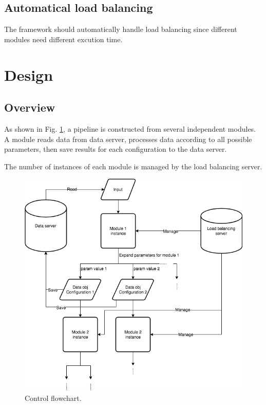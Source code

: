 \documentclass{article}
\begin{document}
    \subsection{Automatical load balancing}
    The framework should automatically handle load balancing since different modules need different excution time.

\section{Design}

    \subsection{Overview}

    As shown in Fig. \ref{fig:control_flow},
    a pipeline is constructed from several independent modules.
    A module reads data from data server,
    processes data according to all possible parameters,
    then save results for each configuration to the data server.

    The number of instances of each module is managed by the load balancing server.

    \begin{figure}[h]
        \begin{center}
            \includegraphics[width=\textwidth]{fig/control_flow.png}
        \end{center}
        \label{fig:control_flow}
        \caption{Control flowchart.}
    \end{figure}
\end{document}
